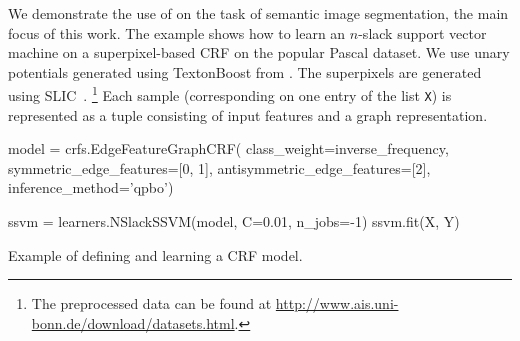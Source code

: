 %

We demonstrate the use of \pystruct on the task of semantic image segmentation,
the main focus of this work. The example shows how to learn an $n$-slack support
vector machine on a superpixel-based CRF on the popular Pascal dataset. We use
unary potentials generated using TextonBoost
from \citet{krahenbuhl2012efficient}. The superpixels are generated using SLIC~\citep{achanta2012slic}.%
\footnote{The preprocessed data can be found at \url{http://www.ais.uni-bonn.de/download/datasets.html}.}
Each sample (corresponding on one entry of the list \texttt{X}) is represented as a
tuple consisting of input features and a graph representation.
\begin{listing}[t]
\begin{pythoncode}
model = crfs.EdgeFeatureGraphCRF(
            class_weight=inverse_frequency,
            symmetric_edge_features=[0, 1],
            antisymmetric_edge_features=[2],
            inference_method='qpbo')

ssvm = learners.NSlackSSVM(model, C=0.01, n_jobs=-1)
ssvm.fit(X, Y)
\end{pythoncode}
\caption{Example of defining and learning a CRF model.\label{lst:stuff}}
\end{listing}

